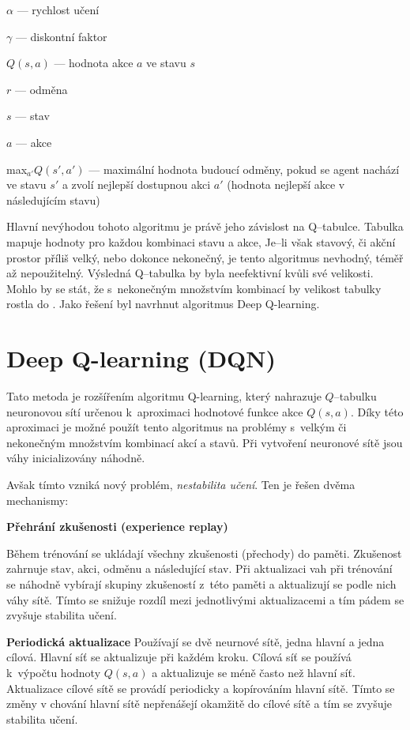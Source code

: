\begin{myitemize}
  \item $\alpha$ --- rychlost učení
  \item $\gamma$ --- diskontní faktor
  \item $Q(s, a)$ --- hodnota akce $a$ ve stavu $s$
   
  \item $r$ --- odměna
  \item $s$ --- stav
  \item $a$ --- akce
  \item max$_{a'}Q(s', a')$ --- maximální hodnota budoucí odměny, pokud se agent nachází ve stavu $s'$ a zvolí nejlepší dostupnou akci $a'$ (hodnota nejlepší akce v následujícím stavu)
\end{myitemize}

Hlavní nevýhodou tohoto algoritmu je právě jeho závislost na Q--tabulce.
Tabulka mapuje hodnoty pro každou kombinaci stavu a akce,
Je--li však stavový, či akční prostor příliš velký, nebo dokonce nekonečný, je tento algoritmus nevhodný, téměř až nepoužitelný.
Výsledná Q--tabulka by byla neefektivní kvůli své velikosti.
Mohlo by se stát, že s~nekonečným množstvím kombinací by velikost tabulky rostla do .
Jako řešení byl navrhnut algoritmus Deep Q-learning.

\section{Deep Q-learning (DQN)}\label{subsec:deep-q-learning}

Tato metoda je rozšířením algoritmu Q-learning, který nahrazuje $Q$--tabulku neuronovou sítí určenou k~aproximaci hodnotové funkce akce $Q(s, a)$.
Díky této aproximaci je možné použít tento algoritmus na problémy s~velkým či nekonečným množstvím kombinací akcí a stavů.
Při vytvoření neuronové sítě jsou váhy inicializovány náhodně.

Avšak tímto vzniká nový problém, \emph{nestabilita učení}.
Ten je řešen dvěma mechanismy:

\begin{myitemize}
  \item \textbf{Přehrání zkušenosti (experience replay)}
  
  Během trénování se ukládají všechny zkušenosti (přechody) do paměti.
  Zkušenost zahrnuje stav, akci, odměnu a následující stav.
  Při aktualizaci vah při trénování se náhodně vybírají skupiny zkušeností z~této paměti a aktualizují se podle nich váhy sítě.
  Tímto se snižuje rozdíl mezi jednotlivými aktualizacemi a tím pádem se zvyšuje stabilita učení.

  \item \textbf{Periodická aktualizace}
  Používají se dvě neurnové sítě, jedna hlavní a jedna cílová.
  Hlavní síť se aktualizuje při každém kroku.
  Cílová síť se používá k~výpočtu hodnoty $Q(s, a)$ a aktualizuje se méně často než hlavní síť.
  Aktualizace cílové sítě se provádí periodicky a kopírováním hlavní sítě.
  Tímto se změny v chování hlavní sítě nepřenášejí okamžitě do cílové sítě a tím se zvyšuje stabilita učení.

\end{myitemize}

